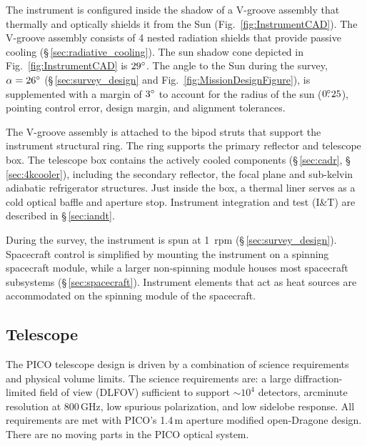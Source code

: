 The instrument is configured inside the shadow of a V-groove assembly that thermally and optically shields it from the Sun (Fig.~\ref{fig:InstrumentCAD}). The V-groove assembly consists of 4 nested radiation shields that provide passive cooling (\S\,\ref{sec:radiative_cooling}). The sun shadow cone depicted in Fig.~\ref{fig:InstrumentCAD} is $29^\circ$. The angle to the Sun during the survey, $\alpha = 26^\circ$ (\S\,\ref{sec:survey_design} and Fig.~\ref{fig:MissionDesignFigure}), is supplemented with a margin of $3^\circ$ to account for the radius of the sun ($0.\!\!^\circ25$), pointing control error, design margin, and alignment tolerances.


The V-groove assembly is attached to the bipod struts that support the instrument structural ring. The ring supports the primary reflector and telescope box. The telescope box contains the actively cooled components (\S\,\ref{sec:cadr}, \S\,\ref{sec:4kcooler}), including the secondary reflector, the focal plane and sub-kelvin adiabatic refrigerator structures. Just inside the box, a thermal liner serves as a cold optical baffle and aperture stop. Instrument integration and test (I\&T) are described in \S\,\ref{sec:iandt}.

During the survey, the instrument is spun at 1~rpm (\S\,\ref{sec:survey_design}). Spacecraft control is simplified by mounting the instrument on a spinning spacecraft module, while a larger non-spinning module houses most spacecraft subsystems (\S\,\ref{sec:spacecraft}). Instrument elements that act as heat sources are accommodated on the spinning module of the spacecraft.

\subsection{Telescope}
\label{sec:telescope} %

The PICO telescope design is driven by a combination of science
requirements and physical volume limits. The science requirements are:
a large diffraction-limited field of view (DLFOV) sufficient to
support $\sim10^4$ detectors, arcminute resolution at 800\,GHz, low
spurious polarization, and low sidelobe response. All
requirements are met with PICO's 1.4\,m aperture modified open-Dragone
design. There are no moving parts in the PICO optical system.


